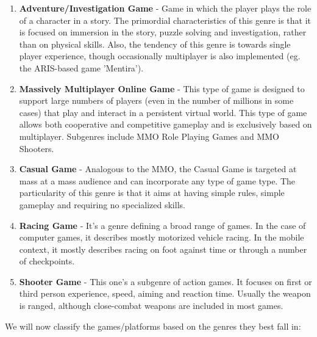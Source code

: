 \documentclass{article}
\begin{document}
\begin{enumerate}
  \item \textbf{Adventure/Investigation Game} - Game in which the player plays
  the role of a character in a story. The primordial characteristics of this
  genre is that it is focused on immersion in the story, puzzle solving and
  investigation, rather than on physical skills. Also, the tendency of this
  genre is towards single player experience, though occasionally multiplayer is
  also implemented (eg. the ARIS-based game 'Mentira').
  
  \item \textbf{Massively Multiplayer Online Game} - This type of game is
  designed to support large numbers of players (even in the number of millions
  in some cases) that play and interact in a persistent virtual world. This type
  of game allows both cooperative and competitive gameplay and is exclusively
  based on multiplayer. Subgenres include MMO Role Playing Games and
  MMO Shooters.
  
  \item \textbf{Casual Game} - Analogous to the MMO, the Casual Game is targeted
  at mass at a mass audience and can incorporate any type of game type. The
  particularity of this genre is that it aims at having simple rules, simple
  gameplay and requiring no specialized skills. 
  
  \item \textbf{Racing Game} - It's a genre defining a broad range of games. In
  the case of computer games, it describes mostly motorized vehicle racing. In
  the mobile context, it mostly describes racing on foot against time or through
  a number of checkpoints.
  
  \item \textbf{Shooter Game} - This one's a subgenre of action games. It
  focuses on first or third person experience, speed, aiming and reaction time.
  Usually the weapon is ranged, although close-combat weapons are included in
  most games.
  
\end{enumerate}

We will now classify the games/platforms based on the genres they best fall in:
\end{document}
